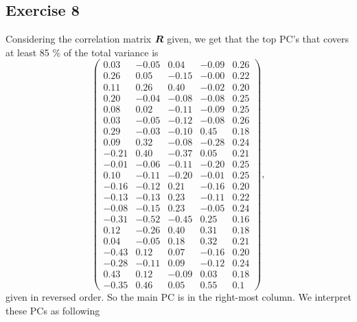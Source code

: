 
\subsection*{Exercise 8}
\label{sec:exercise-8}

Considering the correlation matrix $\bm{R}$ given, we get that the top
PC's that covers at least 85 \% of the total variance is 
\begin{equation*}
  \begin{pmatrix}
    0.03 &-0.05 &0.04 &-0.09 &0.26 \\ 
    0.26 &0.05 &-0.15 &-0.00 &0.22 \\ 
    0.11 &0.26 &0.40 &-0.02 &0.20 \\ 
    0.20 &-0.04 &-0.08 &-0.08 &0.25 \\ 
    0.08 &0.02 &-0.11 &-0.09 &0.25 \\ 
    0.03 &-0.05 &-0.12 &-0.08 &0.26 \\ 
    0.29 &-0.03 &-0.10 &0.45 &0.18 \\ 
    0.09 &0.32 &-0.08 &-0.28 &0.24 \\ 
    -0.21 &0.40 &-0.37 &0.05 &0.21 \\ 
    -0.01 &-0.06 &-0.11 &-0.20 &0.25 \\ 
    0.10 &-0.11 &-0.20 &-0.01 &0.25 \\ 
    -0.16 &-0.12 &0.21 &-0.16 &0.20 \\ 
    -0.13 &-0.13 &0.23 &-0.11 &0.22 \\ 
    -0.08 &-0.15 &0.23 &-0.05 &0.24 \\ 
    -0.31 &-0.52 &-0.45 &0.25 &0.16 \\ 
    0.12 &-0.26 &0.40 &0.31 &0.18 \\ 
    0.04 &-0.05 &0.18 &0.32 &0.21 \\ 
    -0.43 &0.12 &0.07 &-0.16 &0.20 \\ 
    -0.28 &-0.11 &0.09 &-0.12 &0.24 \\ 
    0.43 &0.12 &-0.09 &0.03 &0.18 \\ 
    -0.35 &0.46 &0.05 &0.55 &0.1
  \end{pmatrix},
\end{equation*}
given in reversed order. So the main PC is in the
right-most column. We interpret these PCs as following
